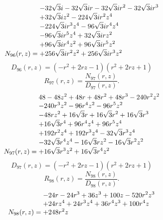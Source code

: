 \documentclass[11pt,a4paper]{article}
\begin{document}
\begin{equation}
N_{96}(r,z)=\shortstack[l]{$\displaystyle  - 32 \sqrt{3} i - 32 \sqrt{3} i r - 32 \sqrt{3} i r^{2} - 32 \sqrt{3} i r^{3}$\\
$\displaystyle  + 32 \sqrt{3} i z^{2} - 224 \sqrt{3} i r^{2} z^{4}$\\
$\displaystyle  - 224 \sqrt{3} i r^{3} z^{4} - 96 \sqrt{3} i r^{4} z^{4}$\\
$\displaystyle  - 96 \sqrt{3} i r^{5} z^{4} + 32 \sqrt{3} i r z^{2}$\\
$\displaystyle  + 96 \sqrt{3} i r^{4} z^{2} + 96 \sqrt{3} i r^{5} z^{2}$\\
$\displaystyle  + 256 \sqrt{3} i r^{2} z^{2} + 256 \sqrt{3} i r^{3} z^{2}$}
\label{eq:cat-numerator-96}
\end{equation}
\begin{equation}
D_{96}(r,z)=\left(- r^{2} + 2 r z - 1\right) \left(r^{2} + 2 r z + 1\right)
\label{eq:cat-denominator-96}
\end{equation}
\begin{equation}
R_{97}(r,z)=\frac{N_{97}(r,z)}{D_{97}(r,z)}.
\label{eq:cat-rational-97}
\end{equation}
\begin{equation}
N_{97}(r,z)=\shortstack[l]{$\displaystyle 48 - 48 z^{2} + 48 r + 48 r^{2} + 48 r^{3} - 240 r^{2} z^{2}$\\
$\displaystyle  - 240 r^{3} z^{2} - 96 r^{4} z^{2} - 96 r^{5} z^{2}$\\
$\displaystyle  - 48 r z^{2} + 16 \sqrt{3} r + 16 \sqrt{3} r^{2} + 16 \sqrt{3} r^{3}$\\
$\displaystyle  + 16 \sqrt{3} r^{4} + 96 r^{4} z^{4} + 96 r^{5} z^{4}$\\
$\displaystyle  + 192 r^{2} z^{4} + 192 r^{3} z^{4} - 32 \sqrt{3} r^{3} z^{4}$\\
$\displaystyle  - 32 \sqrt{3} r^{4} z^{4} - 16 \sqrt{3} r z^{2} - 16 \sqrt{3} r^{2} z^{2}$\\
$\displaystyle  + 16 \sqrt{3} r^{3} z^{2} + 16 \sqrt{3} r^{4} z^{2}$}
\label{eq:cat-numerator-97}
\end{equation}
\begin{equation}
D_{97}(r,z)=\left(- r^{2} + 2 r z - 1\right) \left(r^{2} + 2 r z + 1\right)
\label{eq:cat-denominator-97}
\end{equation}
\begin{equation}
R_{98}(r,z)=\frac{N_{98}(r,z)}{D_{98}(r,z)}.
\label{eq:cat-rational-98}
\end{equation}
\begin{equation}
N_{98}(r,z)=\shortstack[l]{$\displaystyle  - 24 r - 24 r^{3} + 36 z^{3} + 100 z - 520 r^{2} z^{3}$\\
$\displaystyle  + 24 r z^{4} + 24 r^{3} z^{4} + 36 r^{4} z^{3} + 100 r^{4} z$\\
$\displaystyle  + 248 r^{2} z$}
\label{eq:cat-numerator-98}
\end{equation}
\end{document}
